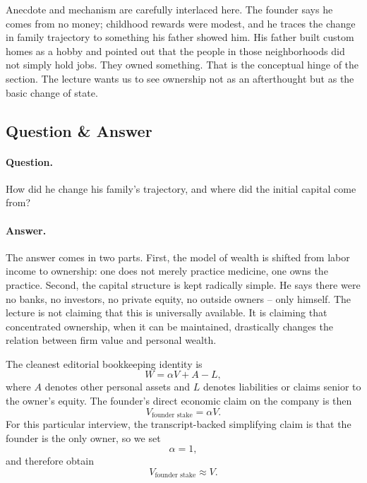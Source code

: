 Anecdote and mechanism are carefully interlaced here. The founder says he comes from no money; childhood rewards were modest, and he traces the change in family trajectory to something his father showed him. His father built custom homes as a hobby and pointed out that the people in those neighborhoods did not simply hold jobs. They owned something. That is the conceptual hinge of the section. The lecture wants us to see ownership not as an afterthought but as the basic change of state.

\subsection{Question \& Answer}

\paragraph{Question.} How did he change his family's trajectory, and where did the initial capital come from?

\paragraph{Answer.} The answer comes in two parts. First, the model of wealth is shifted from labor income to ownership: one does not merely practice medicine, one owns the practice. Second, the capital structure is kept radically simple. He says there were no banks, no investors, no private equity, no outside owners -- only himself. The lecture is not claiming that this is universally available. It is claiming that concentrated ownership, when it can be maintained, drastically changes the relation between firm value and personal wealth.

The cleanest editorial bookkeeping identity is
\begin{equation}
W = \alpha V + A - L,
\end{equation}
where $A$ denotes other personal assets and $L$ denotes liabilities or claims senior to the owner's equity. The founder's direct economic claim on the company is then
\begin{equation}
V_{\text{founder stake}} = \alpha V.
\end{equation}
For this particular interview, the transcript-backed simplifying claim is that the founder is the only owner, so we set
\begin{equation}
\alpha = 1,
\end{equation}
and therefore obtain
\begin{equation}
V_{\text{founder stake}} \approx V.
\end{equation}

